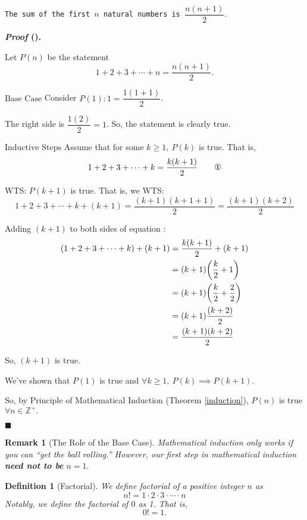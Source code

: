 \documentclass[12pt,a4paper]{article}
\newtheorem{df}{Definition}[subsection]
\newcounter{nprf}[subsection]
\newtheorem*{rmk}{\indent Remark}
\newenvironment*{prf}{\par\indent\textbf{\textit{Proof} (\stepcounter{nprf}\thenprf). }\par }{\par\hfill $\blacksquare$\par}
\def\Z{{\mathbb{Z}}}
\def\Zp{{\Z^{+}}}
\begin{document}
\begin{framed}
\noindent\texttt{The sum of the first $n$ natural numbers is $\dfrac{n(n+1)}{2}.$}
\begin{prf}
	Let $P(n)$ be the statement \[1+2+3+\cdots+n=\frac{n(n+1)}{2}.\]\par $\boxed{\text{Base Case}}$ Consider $P(1): 1=\dfrac{1(1+1)}{2}$.\par\hspace{5mm} The right side is $\dfrac{1(2)}{2}=1$. So, the statement is clearly true.\par $\boxed{\text{Inductive Steps}}$ Assume that for some $k\geq1,\ P(k)$ is true. That is, \[1+2+3+\cdots+k=\dfrac{k(k+1)}{2}\qquad\text{\ding{172}}\]\par\hspace{5mm} WTS: $P(k+1)$ is true. That is, we WTS: \[1+2+3+\cdots+k+(k+1)=\dfrac{(k+1)(k+1+1)}{2}=\dfrac{(k+1)(k+2)}{2}\]\par\hspace{5mm} Adding $(k+1)$ to both sides of equation : \[\begin{aligned} (1+2+3+\cdots+k)+(k+1)&=\dfrac{k(k+1)}{2}+(k+1)\\&=(k+1)\qty(\dfrac{k}{2}+1)\\&=(k+1)\qty(\dfrac{k}{2}+\dfrac{2}{2})\\&=(k+1)\dfrac{(k+2)}{2}\\&=\dfrac{(k+1)(k+2)}{2}\end{aligned}\]\par\hspace{5mm} So, $(k+1)$ is true. \par We've shown that $P(1)$ is true and $\forall k\geq1,\ P(k)\implies P(k+1).$\par So, by Principle of Mathematical Induction (Theorem \ref{induction}), $P(n)$ is true $\forall n\in\Zp.$
\end{prf}
\end{framed}
\begin{rmk}[The Role of the Base Case]
	Mathematical induction only works if you can ``get the ball rolling.'' However, our first step in mathematical induction \textbf{need not to be} $n=1.$
\end{rmk}
\begin{df}[Factorial]
	We define factorial of a positive integer $n$ as \[n!=1\cdot2\cdot3\cdot\cdots\cdot n\] Notably, we define the factorial of $0$ as 1. That is, \[0!=1.\]
\end{df}
\end{document}

